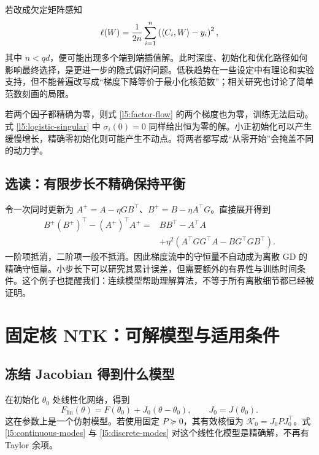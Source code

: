 若改成欠定矩阵感知
\[
 \ell(W)=\frac1{2n}\sum_{i=1}^n
 \left(\left\langle C_i,W\right\rangle-y_i\right)^2,
\]
其中 $n<qd$，便可能出现多个端到端插值解。此时深度、初始化和优化路径如何影响最终选择，是更进一步的隐式偏好问题。低秩趋势在一些设定中有理论和实验支持，但不能普遍改写成“梯度下降等价于最小化核范数”；相关研究也讨论了简单范数刻画的局限\citep{Arora2019}。

\begin{remark}[零初始化与小初始化不可混同]
若两个因子都精确为零，则式 \eqref{l5:factor-flow} 的两个梯度也为零，训练无法启动。式 \eqref{l5:logistic-singular} 中 $\sigma_i(0)=0$ 同样给出恒为零的解。小正初始化可以产生缓慢增长，精确零初始化则可能产生不动点。将两者都写成“从零开始”会掩盖不同的动力学。
\end{remark}

\subsection{选读：有限步长不精确保持平衡}

令一次同时更新为 $A^+=A-\eta GB^\top$、$B^+=B-\eta A^\top G$。直接展开得到
\begin{align}
 B^+(B^+)^\top-(A^+)^\top A^+
 ={}&BB^\top-A^\top A \nonumber\\
 &+\eta^2\left(A^\top GG^\top A-BG^\top GB^\top\right).
 \label{l5:discrete-balance}
\end{align}
一阶项抵消，二阶项一般不抵消。因此梯度流中的守恒量不自动成为离散 GD 的精确守恒量。小步长下可以研究其累计误差，但需要额外的有界性与训练时间条件。这个例子也提醒我们：连续模型帮助理解算法，不等于所有离散细节都已经被证明。

\section{固定核 NTK：可解模型与适用条件}
\label{l5:ntk}

\subsection{冻结 Jacobian 得到什么模型}

在初始化 $\theta_0$ 处线性化网络，得到
\begin{equation}
 F_{\mathrm{lin}}(\theta)
 =F(\theta_0)+J_0(\theta-\theta_0),
 \qquad J_0=J(\theta_0).
 \label{l5:linearized-model}
\end{equation}
这在参数上是一个仿射模型。若使用固定 $P\succeq0$，其有效核恒为
$\mathcal K_0=J_0PJ_0^\top$。式 \eqref{l5:continuous-modes} 与
\eqref{l5:discrete-modes} 对这个线性化模型是精确解，不再有 Taylor 余项。


